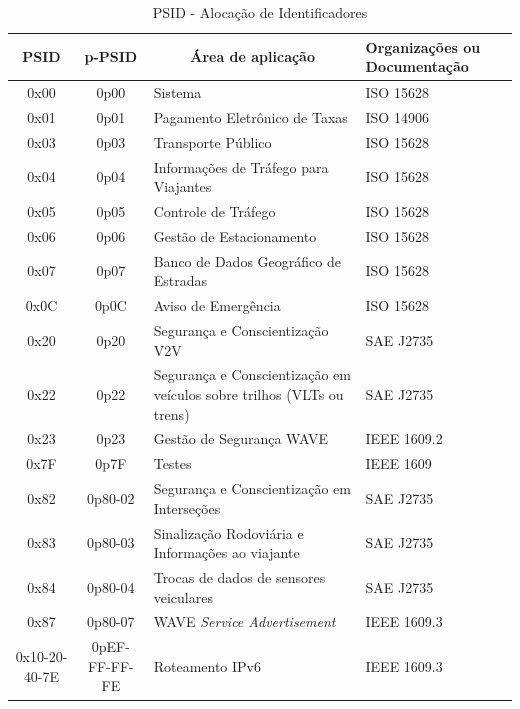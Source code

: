 \documentclass[
12pt,				%
openright,			%
oneside,			%
a4paper,			%
brazil,				%
]{abntex2}
\begin{document}
{\begin{anexosenv}
		\begin{table}[H]
			\renewcommand{\arraystretch}{1.5}
			\centering
			\begin{tabular}{|c|c|p{6cm}|p{3cm}|}
				\hline
				\textbf{PSID} & \textbf{p-PSID} & \multicolumn{1}{c|}{\textbf{Área de aplicação}} & \textbf{Organizações ou Documentação} \\ \hline
				0x00 & 0p00 & Sistema & ISO 15628 \\ \hline
				0x01 & 0p01 & Pagamento Eletrônico de Taxas & ISO 14906 \\ \hline
				0x03 & 0p03 & Transporte Público & ISO 15628 \\ \hline
				0x04 & 0p04 & Informações de Tráfego para Viajantes & ISO 15628 \\ \hline
				0x05 & 0p05 & Controle de Tráfego & ISO 15628\\ \hline 
				0x06 & 0p06 & Gestão de Estacionamento & ISO 15628 \\ \hline
				0x07 & 0p07 & Banco de Dados Geográfico de Estradas & ISO 15628 \\ \hline
				0x0C & 0p0C & Aviso de Emergência & ISO 15628 \\ \hline
				0x20 & 0p20 & Segurança e Conscientização V2V & SAE J2735 \\ \hline
				0x22 & 0p22 & Segurança e Conscientização em veículos sobre trilhos (VLTs ou trens) & SAE J2735 \\ \hline
				0x23 & 0p23 & Gestão de Segurança WAVE & IEEE 1609.2 \\ \hline
				0x7F & 0p7F & Testes & IEEE 1609                             \\ \hline
				0x82 & 0p80-02 & Segurança e Conscientização em Interseções & SAE J2735 \\ \hline
				0x83 & 0p80-03 & Sinalização Rodoviária e Informações ao viajante & SAE J2735 \\ \hline
				0x84 & 0p80-04 & Trocas de dados de sensores veiculares & SAE J2735 \\ \hline
				0x87 & 0p80-07 & WAVE \textit{Service Advertisement} & IEEE 1609.3 \\ \hline
				0x10-20-40-7E & 0pEF-FF-FF-FE & Roteamento IPv6 & IEEE 1609.3 \\ 
				\hline
			\end{tabular}
				\caption{PSID - Alocação de Identificadores}
				\label{tab_9}
		\end{table}
		
		
		

\end{anexosenv}}
\end{document}
